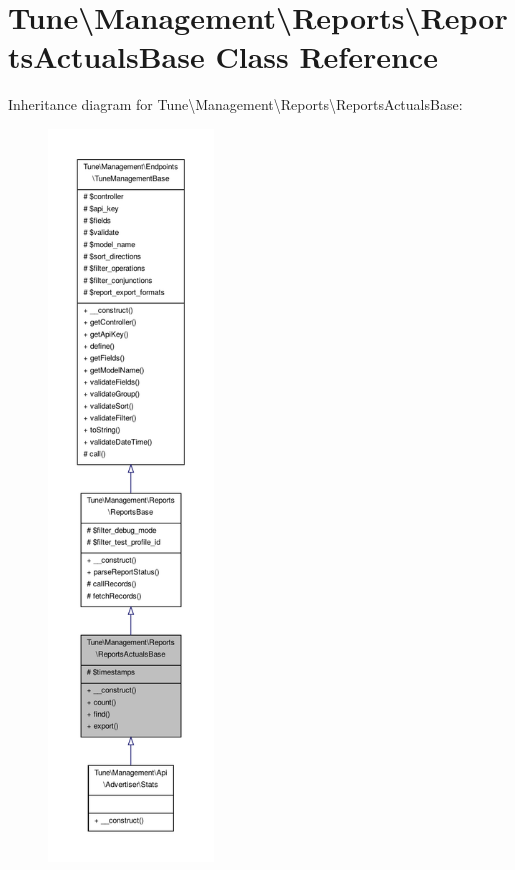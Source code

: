 \hypertarget{classTune_1_1Management_1_1Reports_1_1ReportsActualsBase}{\section{Tune\textbackslash{}Management\textbackslash{}Reports\textbackslash{}Reports\-Actuals\-Base Class Reference}
\label{classTune_1_1Management_1_1Reports_1_1ReportsActualsBase}
}


Inheritance diagram for Tune\textbackslash{}Management\textbackslash{}Reports\textbackslash{}Reports\-Actuals\-Base\-:
\nopagebreak
\begin{figure}[H]
\begin{center}
\leavevmode
\includegraphics[height=550pt]{classTune_1_1Management_1_1Reports_1_1ReportsActualsBase__inherit__graph}
\end{center}
\end{figure}


